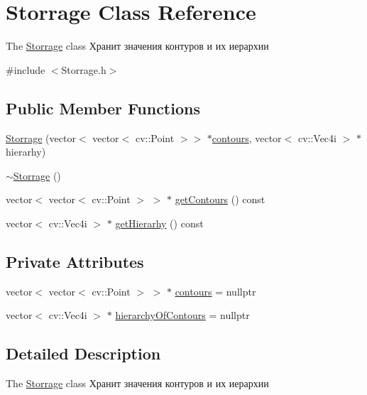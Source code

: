 \hypertarget{class_storrage}{\section{Storrage Class Reference}
\label{class_storrage}
}


The \hyperlink{class_storrage}{Storrage} class Хранит значения контуров и их иерархии  




{\ttfamily \#include $<$Storrage.\+h$>$}

\subsection*{Public Member Functions}
\begin{DoxyCompactItemize}
\item 
\hyperlink{class_storrage_a51a322ff4c3674beaa88417fc437a832}{Storrage} (vector$<$ vector$<$ cv\+::\+Point $>$$>$ $\ast$\hyperlink{class_storrage_a383c9368b9070a2e80ae546b2b403840}{contours}, vector$<$ cv\+::\+Vec4i $>$ $\ast$hierarhy)
\item 
\hyperlink{class_storrage_abe3fcfc281daf37b66a1f56a2d0f27d0}{$\sim$\+Storrage} ()
\item 
vector$<$ vector$<$ cv\+::\+Point $>$ $>$ $\ast$ \hyperlink{class_storrage_a72d26a95d988cde880a765cf6bb909a3}{get\+Contours} () const 
\item 
vector$<$ cv\+::\+Vec4i $>$ $\ast$ \hyperlink{class_storrage_a96e7f72594728b9ffdebd62d390938ec}{get\+Hierarhy} () const 
\end{DoxyCompactItemize}
\subsection*{Private Attributes}
\begin{DoxyCompactItemize}
\item 
vector$<$ vector$<$ cv\+::\+Point $>$ $>$ $\ast$ \hyperlink{class_storrage_a383c9368b9070a2e80ae546b2b403840}{contours} = nullptr
\item 
vector$<$ cv\+::\+Vec4i $>$ $\ast$ \hyperlink{class_storrage_a07627c89e8ac2b17b05039ffae257511}{hierarchy\+Of\+Contours} = nullptr
\end{DoxyCompactItemize}


\subsection{Detailed Description}
The \hyperlink{class_storrage}{Storrage} class Хранит значения контуров и их иерархии 

